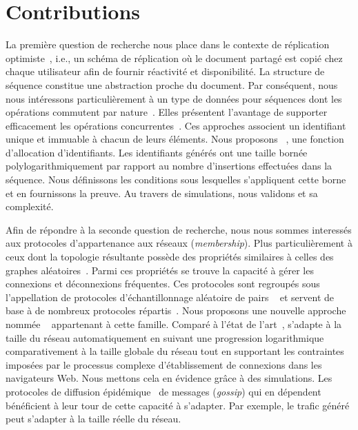 
\section{Contributions}

La première question de recherche nous place dans le contexte de réplication
optimiste~\cite{demers1987epidemic, saito2005optimistic}, i.e., un schéma de
réplication où le document partagé est copié chez chaque utilisateur afin de
fournir réactivité et disponibilité. La structure de séquence constitue une
abstraction proche du document. Par conséquent, nous nous intéressons
particulièrement à un type de données pour séquences dont les opérations
commutent par nature~\cite{burckhardt2014replicated, shapiro2011comprehensive,
  shapiro2011conflict, zawirski2015dependable}. Elles présentent l'avantage de
supporter efficacement les opérations concurrentes~\cite{ahmed2015evaluation,
  ahmed2011evaluating}. Ces approches associent un identifiant unique et
immuable à chacun de leurs éléments. Nous proposons
\LSEQ~\cite{nedelec2013concurrency, nedelec2013lseq}, une fonction d'allocation
d'identifiants. Les identifiants générés ont une taille bornée
polylogarithmiquement par rapport au nombre d'insertions effectuées dans la
séquence. Nous définissons les conditions sous lesquelles s'appliquent cette
borne et en fournissons la preuve. Au travers de simulations, nous validons
\LSEQ et sa complexité.

Afin de répondre à la seconde question de recherche, nous nous sommes interessés
aux protocoles d'appartenance aux réseaux (\emph{membership}). Plus
particulièrement à ceux dont la topologie résultante possède des propriétés
similaires à celles des graphes aléatoires~\cite{erdos1959random}. Parmi ces
propriétés se trouve la capacité à gérer les connexions et déconnexions
fréquentes. Ces protocoles sont regroupés sous l'appellation de \og protocoles
d'échantillonnage aléatoire de pairs \fg~\cite{jelasity2004peer,
  jelasity2007gossip} et servent de base à de nombreux protocoles
répartis~\cite{dabek2004vivaldi, folz2016cyclades, montresor2005chord}. Nous
proposons une nouvelle approche nommée \SPRAY~\cite{nedelec2015spray}
appartenant à cette famille. Comparé à l'état de
l'art~\cite{eugster2003lightweight, ganesh2001scamp, jelasity2007gossip,
  leitao2007dependable, tolgyeski2009adaptive, voulgaris2005cyclon}, \SPRAY
s'adapte à la taille du réseau automatiquement en suivant une progression
logarithmique comparativement à la taille globale du réseau tout en supportant
les contraintes imposées par le processus complexe d'établissement de connexions
dans les navigateurs Web. Nous mettons cela en évidence grâce à des simulations.
Les protocoles de diffusion épidémique~\cite{birman1999bimodal} de messages
(\emph{gossip}) qui en dépendent bénéficient à leur tour de cette capacité à
s'adapter. Par exemple, le trafic généré peut s'adapter à la taille réelle du
réseau.

